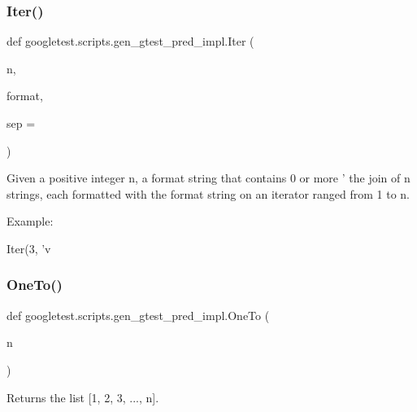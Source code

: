 \subsubsection{\texorpdfstring{Iter()}{Iter()}}
{\footnotesize\ttfamily def googletest.\+scripts.\+gen\+\_\+gtest\+\_\+pred\+\_\+impl.\+Iter (\begin{DoxyParamCaption}\item[{}]{n,  }\item[{}]{format,  }\item[{}]{sep = {\ttfamily \textquotesingle{}\textquotesingle{}} }\end{DoxyParamCaption})}

\begin{DoxyVerb}Given a positive integer n, a format string that contains 0 or
more '%
the join of n strings, each formatted with the format string on an
iterator ranged from 1 to n.

Example:

Iter(3, 'v%
\end{DoxyVerb}
 \mbox{\label{namespacegoogletest_1_1scripts_1_1gen__gtest__pred__impl_aff65c970b0fa35339cbfe53a97499ce4}} 
\subsubsection{\texorpdfstring{OneTo()}{OneTo()}}
{\footnotesize\ttfamily def googletest.\+scripts.\+gen\+\_\+gtest\+\_\+pred\+\_\+impl.\+One\+To (\begin{DoxyParamCaption}\item[{}]{n }\end{DoxyParamCaption})}

\begin{DoxyVerb}Returns the list [1, 2, 3, ..., n].\end{DoxyVerb}
 \mbox{\label{namespacegoogletest_1_1scripts_1_1gen__gtest__pred__impl_ab79fc4240cc9581f0c71f2f088d18292}} 
